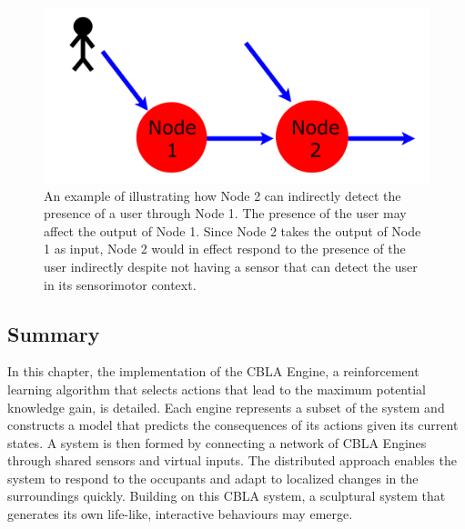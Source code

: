 \begin{figure}[!htb]
	\centering
	\includegraphics[height=0.20 \textheight]{"fig/cbla/Indirect input diagram"}
	\caption[Illustration explaining how virtual inputs may be used to detect changes outside of a node's sensorimotor context]{An example of illustrating how Node 2 can indirectly detect the presence of a user through Node 1. The presence of the user may affect the output of Node 1. Since Node 2 takes the output of Node 1 as input, Node 2 would in effect respond to the presence of the user indirectly despite not having a sensor that can detect the user in its sensorimotor context.}
	\label{fig:Indirect input diagram}
\end{figure}

\subsection{Summary}

In this chapter, the implementation of the CBLA Engine, a reinforcement learning algorithm that selects actions that lead to the maximum potential knowledge gain, is detailed. Each engine represents a subset of the system and constructs a model that predicts the consequences of its actions given its current states. A system is then formed by connecting a network of CBLA Engines through shared sensors and virtual inputs. The distributed approach enables the system to respond to the occupants and adapt to localized changes in the surroundings quickly. Building on this CBLA system, a sculptural system that generates its own life-like, interactive behaviours may emerge.

\FloatBarrier  

